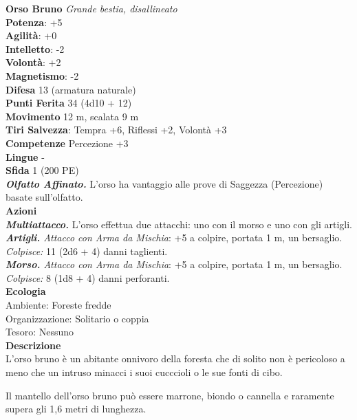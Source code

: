 \begin{multicols}{2}
\medskip\textbf{Orso Bruno}
\emph{Grande bestia, disallineato}\\
\textbf{Potenza}: +5\\
\textbf{Agilità}: +0\\
\textbf{Intelletto}: -2\\
\textbf{Volontà}: +2\\
\textbf{Magnetismo}: -2\\
\textbf{Difesa} 13 (armatura naturale)\\
\textbf{Punti Ferita} 34 (4d10 + 12)\\
\textbf{Movimento} 12 m, scalata 9 m\\
\textbf{Tiri Salvezza}: Tempra +6, Riflessi +2, Volontà +3 \\
\textbf{Competenze} Percezione +3\\
\textbf{Lingue} -\\
\textbf{Sfida} 1 (200 PE)\smallskip\\
\emph{\textbf{Olfatto Affinato.}} L'orso ha vantaggio alle prove di Saggezza (Percezione) basate sull'olfatto.\\
\smallskip\textbf{Azioni}\\
\emph{\textbf{Multiattacco.}} L'orso effettua due attacchi: uno con il morso e uno con gli artigli.\\
\emph{\textbf{Artigli.} Attacco con Arma da Mischia}: +5 a colpire, portata 1 m, un bersaglio.\\
\emph{Colpisce:} 11 (2d6 + 4) danni taglienti.\\
\emph{\textbf{Morso.} Attacco con Arma da Mischia}: +5 a colpire, portata 1 m, un bersaglio.\\
\emph{Colpisce:} 8 (1d8 + 4) danni perforanti.\\
\textbf{Ecologia}\\
Ambiente: Foreste fredde\\
Organizzazione: Solitario o coppia\\
Tesoro: Nessuno\\
\textbf{Descrizione}\\

L'orso bruno è un abitante onnivoro della foresta che di solito non è pericoloso a meno che un intruso minacci i suoi cucccioli o le sue fonti di cibo.

Il mantello dell'orso bruno può essere marrone, biondo o cannella e raramente supera gli 1,6 metri di lunghezza. 


\end{multicols}
